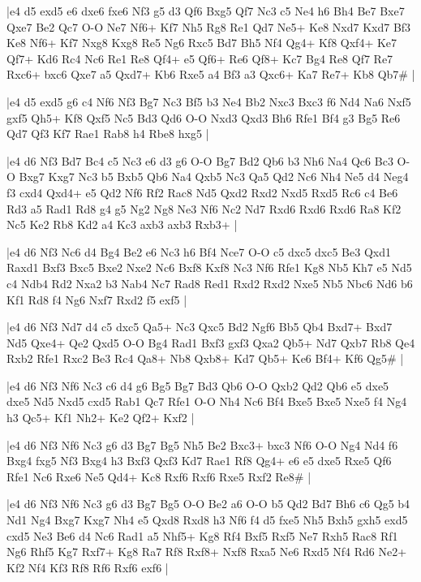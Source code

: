 \whitename{}
\blackname{}
\makegametitle
|e4 d5 exd5 e6 dxe6 fxe6 Nf3 g5 d3 Qf6 Bxg5 Qf7 Nc3 c5 Ne4 h6 Bh4 Be7 Bxe7 Qxe7 Be2 Qc7 O-O Ne7 Nf6+ Kf7 Nh5 Rg8 Re1 Qd7 Ne5+ Ke8 Nxd7 Kxd7 Bf3 Ke8 Nf6+ Kf7 Nxg8 Kxg8 Re5 Ng6 Rxc5 Bd7 Bh5 Nf4 Qg4+ Kf8 Qxf4+ Ke7 Qf7+ Kd6 Rc4 Nc6 Re1 Re8 Qf4+ e5 Qf6+ Re6 Qf8+ Kc7 Bg4 Re8 Qf7 Re7 Rxc6+ bxc6 Qxe7 a5 Qxd7+ Kb6 Rxe5 a4 Bf3 a3 Qxc6+ Ka7 Re7+ Kb8 Qb7\#  |

\whitename{}
\blackname{}
\makegametitle
|e4 d5 exd5 g6 c4 Nf6 Nf3 Bg7 Nc3 Bf5 b3 Ne4 Bb2 Nxc3 Bxc3 f6 Nd4 Na6 Nxf5 gxf5 Qh5+ Kf8 Qxf5 Nc5 Bd3 Qd6 O-O Nxd3 Qxd3 Bh6 Rfe1 Bf4 g3 Bg5 Re6 Qd7 Qf3 Kf7 Rae1 Rab8 h4 Rbe8 hxg5  |

\whitename{}
\blackname{}
\makegametitle
|e4 d6 Nf3 Bd7 Bc4 c5 Nc3 e6 d3 g6 O-O Bg7 Bd2 Qb6 b3 Nh6 Na4 Qc6 Bc3 O-O Bxg7 Kxg7 Nc3 b5 Bxb5 Qb6 Na4 Qxb5 Nc3 Qa5 Qd2 Nc6 Nh4 Ne5 d4 Neg4 f3 cxd4 Qxd4+ e5 Qd2 Nf6 Rf2 Rac8 Nd5 Qxd2 Rxd2 Nxd5 Rxd5 Rc6 c4 Be6 Rd3 a5 Rad1 Rd8 g4 g5 Ng2 Ng8 Ne3 Nf6 Nc2 Nd7 Rxd6 Rxd6 Rxd6 Ra8 Kf2 Nc5 Ke2 Rb8 Kd2 a4 Kc3 axb3 axb3 Rxb3+  |

\whitename{}
\blackname{}
\makegametitle
|e4 d6 Nf3 Nc6 d4 Bg4 Be2 e6 Nc3 h6 Bf4 Nce7 O-O c5 dxc5 dxc5 Be3 Qxd1 Raxd1 Bxf3 Bxc5 Bxe2 Nxe2 Nc6 Bxf8 Kxf8 Nc3 Nf6 Rfe1 Kg8 Nb5 Kh7 e5 Nd5 c4 Ndb4 Rd2 Nxa2 b3 Nab4 Nc7 Rad8 Red1 Rxd2 Rxd2 Nxe5 Nb5 Nbc6 Nd6 b6 Kf1 Rd8 f4 Ng6 Nxf7 Rxd2 f5 exf5  |

\whitename{}
\blackname{}
\makegametitle
|e4 d6 Nf3 Nd7 d4 c5 dxc5 Qa5+ Nc3 Qxc5 Bd2 Ngf6 Bb5 Qb4 Bxd7+ Bxd7 Nd5 Qxe4+ Qe2 Qxd5 O-O Bg4 Rad1 Bxf3 gxf3 Qxa2 Qb5+ Nd7 Qxb7 Rb8 Qe4 Rxb2 Rfe1 Rxc2 Be3 Rc4 Qa8+ Nb8 Qxb8+ Kd7 Qb5+ Ke6 Bf4+ Kf6 Qg5\#  |

\whitename{}
\blackname{}
\makegametitle
|e4 d6 Nf3 Nf6 Nc3 c6 d4 g6 Bg5 Bg7 Bd3 Qb6 O-O Qxb2 Qd2 Qb6 e5 dxe5 dxe5 Nd5 Nxd5 cxd5 Rab1 Qc7 Rfe1 O-O Nh4 Nc6 Bf4 Bxe5 Bxe5 Nxe5 f4 Ng4 h3 Qc5+ Kf1 Nh2+ Ke2 Qf2+ Kxf2  |

\whitename{}
\blackname{}
\makegametitle
|e4 d6 Nf3 Nf6 Nc3 g6 d3 Bg7 Bg5 Nh5 Be2 Bxc3+ bxc3 Nf6 O-O Ng4 Nd4 f6 Bxg4 fxg5 Nf3 Bxg4 h3 Bxf3 Qxf3 Kd7 Rae1 Rf8 Qg4+ e6 e5 dxe5 Rxe5 Qf6 Rfe1 Nc6 Rxe6 Ne5 Qd4+ Kc8 Rxf6 Rxf6 Rxe5 Rxf2 Re8\#  |

\whitename{}
\blackname{}
\makegametitle
|e4 d6 Nf3 Nf6 Nc3 g6 d3 Bg7 Bg5 O-O Be2 a6 O-O b5 Qd2 Bd7 Bh6 c6 Qg5 b4 Nd1 Ng4 Bxg7 Kxg7 Nh4 e5 Qxd8 Rxd8 h3 Nf6 f4 d5 fxe5 Nh5 Bxh5 gxh5 exd5 cxd5 Ne3 Be6 d4 Nc6 Rad1 a5 Nhf5+ Kg8 Rf4 Bxf5 Rxf5 Ne7 Rxh5 Rac8 Rf1 Ng6 Rhf5 Kg7 Rxf7+ Kg8 Ra7 Rf8 Rxf8+ Nxf8 Rxa5 Ne6 Rxd5 Nf4 Rd6 Ne2+ Kf2 Nf4 Kf3 Rf8 Rf6 Rxf6 exf6  |


